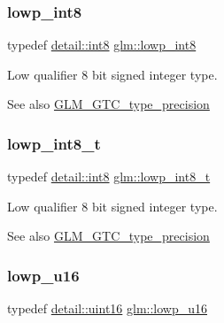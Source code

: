 \subsubsection{\texorpdfstring{lowp\+\_\+int8}{lowp\_int8}}
{\footnotesize\ttfamily typedef \mbox{\hyperlink{namespaceglm_1_1detail_a04b526a8d7a9b455602a0afa78c531e0}{detail\+::int8}} \mbox{\hyperlink{group__gtc__type__precision_gaf9e675b6392764242ae87eb179e9d3d6}{glm\+::lowp\+\_\+int8}}}

Low qualifier 8 bit signed integer type. \begin{DoxySeeAlso}{See also}
\mbox{\hyperlink{group__gtc__type__precision}{G\+L\+M\+\_\+\+G\+T\+C\+\_\+type\+\_\+precision}} 
\end{DoxySeeAlso}
\mbox{\label{group__gtc__type__precision_gae6092311f6970a305c2df19a372360a3}} 
\subsubsection{\texorpdfstring{lowp\+\_\+int8\+\_\+t}{lowp\_int8\_t}}
{\footnotesize\ttfamily typedef \mbox{\hyperlink{namespaceglm_1_1detail_a04b526a8d7a9b455602a0afa78c531e0}{detail\+::int8}} \mbox{\hyperlink{group__gtc__type__precision_gae6092311f6970a305c2df19a372360a3}{glm\+::lowp\+\_\+int8\+\_\+t}}}

Low qualifier 8 bit signed integer type. \begin{DoxySeeAlso}{See also}
\mbox{\hyperlink{group__gtc__type__precision}{G\+L\+M\+\_\+\+G\+T\+C\+\_\+type\+\_\+precision}} 
\end{DoxySeeAlso}
\mbox{\label{group__gtc__type__precision_ga22c5364f27caa0a6eb0627cbc21e46be}} 
\subsubsection{\texorpdfstring{lowp\+\_\+u16}{lowp\_u16}}
{\footnotesize\ttfamily typedef \mbox{\hyperlink{namespaceglm_1_1detail_a47b2a7d006d187338e8031a352d1ce56}{detail\+::uint16}} \mbox{\hyperlink{group__gtc__type__precision_ga22c5364f27caa0a6eb0627cbc21e46be}{glm\+::lowp\+\_\+u16}}}

